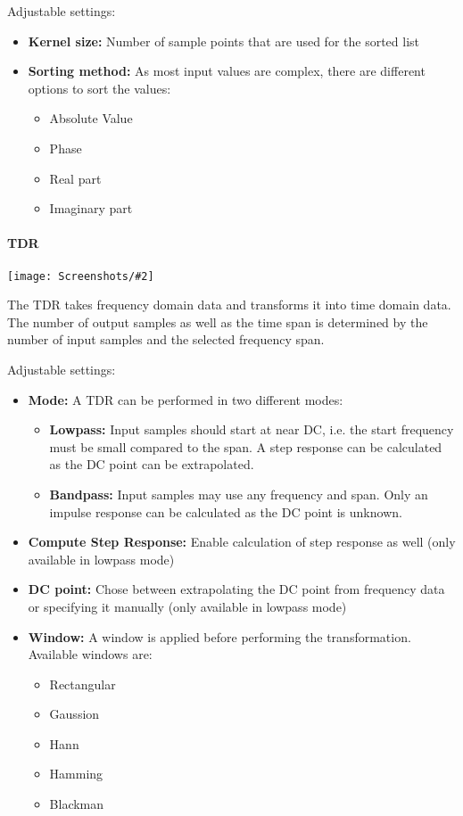 \documentclass[a4paper,11pt]{article}
\newcommand{\screenshot}[2]{\begin{center}
\texttt{[image: Screenshots/\#2]}
\end{center}}
\begin{document}
Adjustable settings:
\begin{itemize}
\item \textbf{Kernel size:} Number of sample points that are used for the sorted list
\item \textbf{Sorting method:} As most input values are complex, there are different options to sort the values:
\begin{itemize}
\item Absolute Value
\item Phase
\item Real part
\item Imaginary part
\end{itemize}
\end{itemize}
\paragraph{TDR}
\screenshot{0.4}{MathOpTDR.png}
The TDR takes frequency domain data and transforms it into time domain data. The number of output samples as well as the time span is determined by the number of input samples and the selected frequency span.

Adjustable settings:
\begin{itemize}
\item \textbf{Mode:} A TDR can be performed in two different modes:
\begin{itemize}
\item \textbf{Lowpass:} Input samples should start at near DC, i.e. the start frequency must be small compared to the span. A step response can be calculated as the DC point can be extrapolated.
\item \textbf{Bandpass:} Input samples may use any frequency and span. Only an impulse response can be calculated as the DC point is unknown.
\end{itemize}
\item \textbf{Compute Step Response:} Enable calculation of step response as well (only available in lowpass mode)
\item \textbf{DC point:} Chose between extrapolating the DC point from frequency data or specifying it manually (only available in lowpass mode)
\item \textbf{Window:} A window is applied before performing the transformation. Available windows are:
\begin{itemize}
\item Rectangular
\item Gaussion
\item Hann
\item Hamming
\item Blackman
\end{itemize}
\end{itemize}
\end{document}
